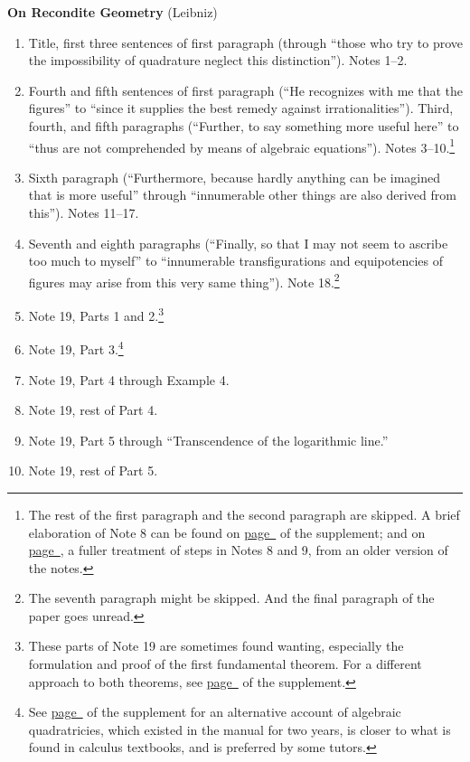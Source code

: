 \documentclass[10pt]{article}
\begin{document}
{\textbf{On Recondite Geometry} (Leibniz)
\begin{enumerate}[resume*] \item Title, first three
		sentences of first paragraph (through
		``those who try to prove the impossibility
		of quadrature neglect this distinction'').
		Notes 1--2.  
	\item Fourth and fifth sentences of first paragraph
		(``He recognizes with me that the figures''
		to ``since it supplies the best remedy
		against irrationalities''). Third, fourth,
	       and fifth paragraphs (``Further, to say
	       something more useful here'' to ``thus are
	       not comprehended by means of algebraic
	       equations''). Notes 3--10.\footnote{The rest
		       of the first paragraph and the second
		       paragraph are skipped. A brief
		       elaboration of Note 8 can be found on
		       \hyperref[supple.21]{page~\pageref{supple.21}}
		       of the supplement; and 
	       on
	       \hyperref[supple.22]{page~\pageref{supple.22}},
a fuller treatment of steps in Notes 8 and 9,
	       from an older version of the notes.}
       \item Sixth paragraph (``Furthermore, because hardly
	       anything can be imagined that is more
	       useful'' through ``innumerable other things
	       are also derived from this''). Notes 11--17.	       
       \item Seventh and eighth paragraphs (``Finally, so
	       that I may not seem to ascribe too much to
	       myself'' to ``innumerable transfigurations
	       and equipotencies of figures may arise from
	       this very same thing''). Note
	       18.\footnote{The seventh paragraph might be
		       skipped. And the final paragraph of
		       the paper goes
		       unread.}
       \item Note 19, Parts 1 and 2.\footnote{These parts
		       of Note 19 are sometimes found
		       wanting, especially the
		       formulation and proof of the first
		       fundamental theorem. For a different
		       approach to both theorems, see 
		       \hyperref[supple.28]{page~\pageref{supple.28}}
		       of the supplement.} 
       \item Note 19, Part 3.\footnote{See
		       \hyperref[supple.30]{page~\pageref{supple.30}}
		       of the supplement for an alternative
		       account of algebraic quadratricies,
		       which existed in the manual for two
		       years, is 
		       closer to what is found in calculus
		       textbooks, and is preferred by some
		       tutors.}  
       \item Note 19, Part 4 through Example 4.
       \item Note 19, rest of Part 4.
       \item Note 19, Part 5 through ``Transcendence of the
	       logarithmic line.''
       \item Note 19, rest of Part 5.
\end{enumerate}

}
\end{document}
